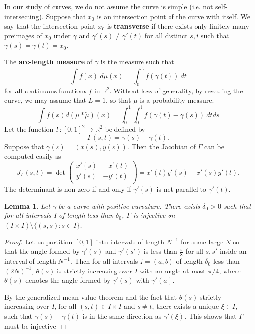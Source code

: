 \documentclass[12pt,a4paper,oneside]{amsart}
\newtheorem{lemma}{Lemma}
\theoremstyle{definition}
\newcommand{\RR}{{\mathbb R}}
\newcommand{\wt}[1]{\widetilde{#1}}
\newcounter{rem}
\begin{document}
In our study of curves, we do not assume the curve is simple {(i.e. not self-intersecting)}. Suppose that $x_0$ is an intersection point of the curve with itself. We say that the intersection point $x_0$ is {\bf transverse} if there exists only finitely many preimages of $x_0$ under $\gamma$ and  $\gamma' (s)\ne \gamma'(t)$ for all distinct $s,t$ such that $\gamma(s) = \gamma(t) = x_0$.  



The {\bf arc-length measure} of $\gamma$ is the measure such that 
$$
\int f(x)~d\mu(x) = \int_0^L f(\gamma(t))~dt
$$
for all continuous functions $f$ in $\RR^2$. Without loss of generality, by rescaling the curve, we may assume that $L = 1$, so that $\mu$ is a probability measure.  
\begin{equation}\label{eq-auto-correlation}
\int f(x)d(\mu\ast\wt{\mu})(x) = \int_0^1\int_0^1 f(\gamma(t)-\gamma(s))~dtds
\end{equation}
{Let the function $\Gamma:[0, 1]^2 \to \RR^2$ be defined by}
\begin{equation}\label{eq-Gamma(s,t)}
\Gamma (s,t) = \gamma(s)-\gamma(t). 
\end{equation}
Suppose that $\gamma(s) = (x(s),y(s))$. Then the Jacobian of $\Gamma$ can be computed easily as 
\begin{equation}\label{eq_Jacobian}
J_{\Gamma}(s,t) = \det \begin{pmatrix} x'(s) & -x'(t)\\y'(s) & -y'(t)\\\end{pmatrix} = x'(t)y'(s)-x'(s)y'(t). 
\end{equation}
The determinant is non-zero if and only if $\gamma'(s)$ is not parallel to $\gamma'(t)$. 


\begin{lemma}\label{lemma_self}
    Let $\gamma$ be a curve with positive curvature. There exists $\delta_0>0$ such that for all intervals $I$ of length less than $\delta_0$, $\Gamma$ is injective on $(I\times I)\setminus\{(s,s):s\in I\}$.
\end{lemma}

\begin{proof}
Let us partition $[0,1]$ into intervals of length $N^{-1}$ for some large $N$ so that
{ the angle formed by $\gamma'(s)$ and $\gamma'(s')$ is less than $\frac{\pi}{8}$}
for all $s,s'$ inside an interval of length $N^{-1}$. Then for all intervals {$I = (a, b)$} of length $\delta_0$ less than $(2N)^{-1}$, $\theta(s)$ is strictly increasing over $I$ with an angle at most $\pi/4$, {where $\theta(s)$ denotes the angle formed by $\gamma'(s)$ with $\gamma'(a)$.}

By the generalized mean value theorem and the fact that $\theta(s)$ strictly increasing over $I$, for all $(s,t)\in I\times I$ and $s\ne t$, there exists a unique $\xi\in I$, such that $\gamma(s)-\gamma(t)$ is in the same direction as $\gamma'(\xi)$. This shows that $\Gamma$ must be injective.
\end{proof}
\end{document}

